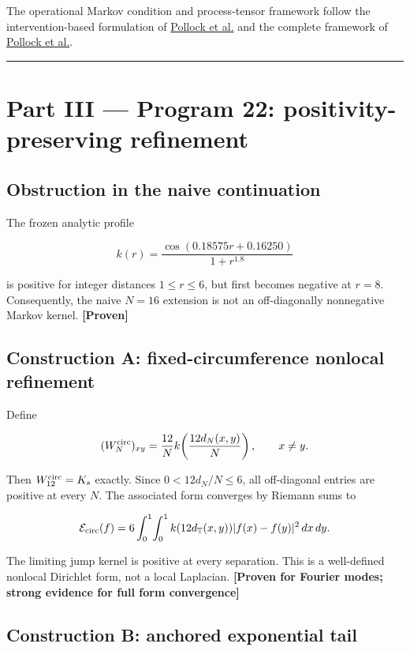 \documentclass[11pt,a4paper,openany]{report}
\newcommand{\statusProven}{\textcolor{fingreen}{[Proven]}}
\begin{document}
The operational Markov condition and process-tensor framework follow the intervention-based formulation of \href{https://doi.org/10.1103/PhysRevLett.120.040405}{Pollock et al.} and the complete framework of \href{https://doi.org/10.1103/PhysRevA.97.012127}{Pollock et al.}.

\par\medskip\hrule\medskip

\chapter{Part III — Program 22: positivity-preserving refinement}

\section{Obstruction in the naive continuation}

The frozen analytic profile

\[
k(r)=\frac{\cos(0.18575r+0.16250)}{1+r^{1.8}}
\]

is positive for integer distances \(1\le r\le6\), but first becomes negative at \(r=8\). Consequently, the naive \(N=16\) extension is not an off-diagonally nonnegative Markov kernel. \textbf{\statusProven{}}

\section{Construction A: fixed-circumference nonlocal refinement}

Define

\[
(W_N^{\rm circ})_{xy}
=\frac{12}{N}
k\!\left(\frac{12d_N(x,y)}{N}\right),
\qquad x\ne y.
\]

Then \(W_{12}^{\rm circ}=K_s\) exactly. Since \(0<12d_N/N\le6\), all off-diagonal entries are positive at every \(N\). The associated form converges by Riemann sums to

\[
\mathcal E_{\rm circ}(f)
=6\int_0^1\!\int_0^1
k(12d_{\mathbb T}(x,y))
|f(x)-f(y)|^2\,dx\,dy.
\]

The limiting jump kernel is positive at every separation. This is a well-defined nonlocal Dirichlet form, not a local Laplacian. \textbf{[Proven for Fourier modes; strong evidence for full form convergence]}

\section{Construction B: anchored exponential tail}
\end{document}
